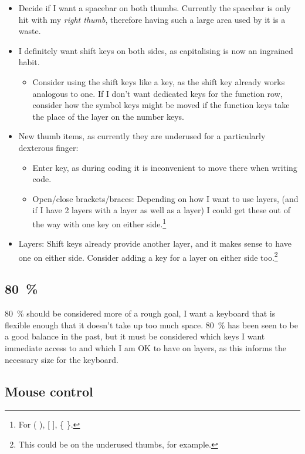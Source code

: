 \documentclass[11pt,a4paper]{article}
\numberwithin{equation}{section}
\begin{document}
\begin{itemize}
    \item Decide if I want a spacebar on both thumbs. Currently the spacebar is only hit with my \textit{right thumb}, therefore having such a large area used by it is a waste.
    \item I definitely want shift keys on both sides, as capitalising is now an ingrained habit.
    \begin{itemize}
        \item Consider using the shift keys like a  key, as the shift key already works analogous to one. If I don't want dedicated keys for the function row, consider how the symbol keys might be moved if the function keys take the place of the  layer on the number keys.
    \end{itemize}
    \item New thumb items, as currently they are underused for a particularly dexterous finger:
    \begin{itemize}
        \item Enter key, as during coding it is inconvenient to move there when writing code.
        \item Open/close brackets/braces: Depending on how I want to use layers, (and if I have 2 layers with a  layer as well as a  layer) I could get these out of the way with one key on either side.\footnote{For ( ), [ ], \{ \}.}
    \end{itemize}
    \item Layers: Shift keys already provide another layer, and it makes sense to have one on either side. Consider adding a  key for a layer on either side too.\footnote{This could be on the underused thumbs, for example.}
\end{itemize}

\subsection{\texorpdfstring{\SI{80}{\percent}}{80 Percent}}

\SI{80}{\percent} should be considered more of a rough goal, I want a keyboard that is flexible enough that it doesn't take up too much space. \SI{80}{\percent} has been seen to be a good balance in the past, but it must be considered which keys I want immediate access to and which I am OK to have on layers, as this informs the necessary size for the keyboard.

\subsection{Mouse control}
\end{document}
